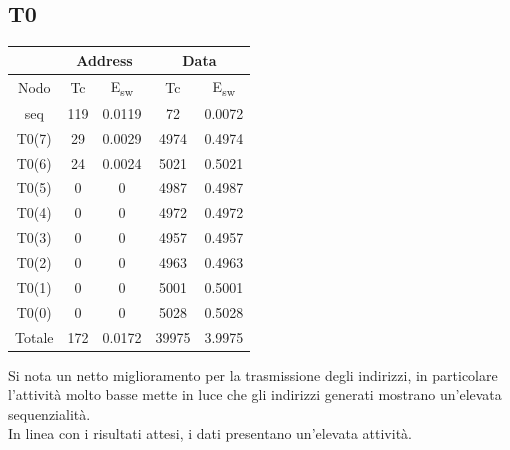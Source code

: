 \documentclass[11pt,  english, makeidx, a4paper, titlepage, oneside]{book}
\begin{document}
\subsection{T0}
\begin{center}
	\begin{tabular}{|c|c|c|c|c|}
	\hline
	& \multicolumn{2}{c}{Address} & \multicolumn{2}{c}{Data}\\
	\hline
	Nodo & Tc & E\textsubscript{sw} & Tc & E\textsubscript{sw} \\
	\hline
	seq & 119 & 0.0119 & 72 & 0.0072  \\
	\hline
	T0(7) & 29 & 0.0029 & 4974 & 0.4974\\
	 \hline
	T0(6) & 24 & 0.0024 & 5021 & 0.5021\\
	\hline
	T0(5) & 0 & 0 & 4987 & 0.4987\\
	\hline
	T0(4) & 0 & 0 & 4972 & 0.4972\\
	\hline
	T0(3) & 0 & 0 & 4957 & 0.4957\\
	\hline
	T0(2) & 0 & 0 & 4963 & 0.4963\\
	\hline
	T0(1) & 0 & 0 & 5001 & 0.5001\\
	\hline
	T0(0) & 0 & 0 & 5028 & 0.5028\\
	\hline
	Totale & 172 & 0.0172 & 39975 & 3.9975\\
	\hline
	\end{tabular}	
\end{center}
\vspace{0.3cm}
Si nota un netto miglioramento per la trasmissione degli indirizzi, in particolare l'attività molto basse mette in luce che gli indirizzi generati mostrano un'elevata sequenzialità.
\\
In linea con i risultati attesi, i dati presentano un'elevata attività.
\end{document}
